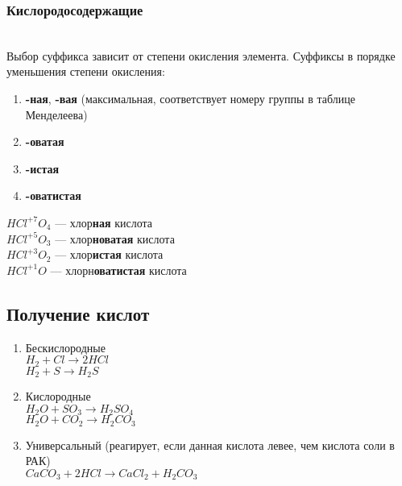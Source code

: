 \subsubsection{Кислородосодержащие}
\\
Выбор суффикса зависит от степени окисления элемента.
Суффиксы в порядке уменьшения степени окисления:
\begin{enumerate}
    \item \textbf{-ная}, \textbf{-вая} (максимальная, соответствует номеру
                                        группы в таблице Менделеева)
    \item \textbf{-оватая}
    \item \textbf{-истая}
    \item \textbf{-оватистая}
\end{enumerate}
$HCl^{+7}O_4$ --- хлор\textbf{ная} кислота\\
$HCl^{+5}O_3$ --- хлор\textbf{новатая} кислота\\
$HCl^{+3}O_2$ --- хлор\textbf{истая} кислота\\
$HCl^{+1}O$   --- хлорн\textbf{оватистая} кислота\\



\subsection{Получение кислот}
\begin{enumerate}
    \item Бескислородные\\
        $H_2 + Cl \rightarrow 2HCl$\\
        $H_2 + S \rightarrow H_2S$

    \item Кислородные\\
        $H_2O + SO_3 \rightarrow H_2SO_4$\\
        $H_2O + CO_2 \rightarrow H_2CO_3$

    \item Универсальный (реагирует, если данная кислота левее, чем кислота соли в РАК)\\
        $CaCO_3 + 2HCl \rightarrow CaCl_2 + H_2CO_3$

\end{enumerate}



